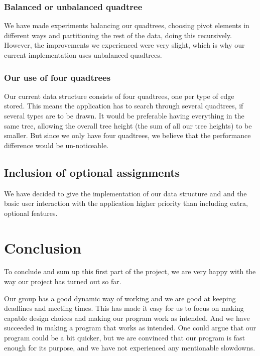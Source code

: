 \documentclass[a4paper,11pt]{article}
\begin{document}
\subsubsection{Balanced or unbalanced quadtree} %
We have made experiments balancing our quadtrees, choosing pivot elements in different ways and partitioning the rest of the data, doing this recursively. However, the improvements we experienced were very slight, which is why our current implementation uses unbalanced quadtrees.

\subsubsection{Our use of four quadtrees} %
Our current data structure consists of four quadtrees, one per type of edge stored. This means the application has to search through several quadtrees, if several types are to be drawn. It would be preferable having everything in the same tree, allowing the overall tree height (the sum of all our tree heights) to be smaller. But since we only have four quadtrees, we believe that the performance difference would be un-noticeable.

\subsection{Inclusion of optional assignments} %
We have decided to give the implementation of our data structure and and the basic user interaction with the application higher priority than including extra, optional features.

\pagebreak
\section{Conclusion} %
\label{sec:Conclusion}
To conclude and sum up this first part of the project, we are very happy with the way our project has turned out so far. 

Our group has a good dynamic way of working and we are good at keeping deadlines and meeting times. This has made it easy for us to focus on making
capable design choices and making our program work as intended. And we have succeeded in making a program that works as intended. One could argue that our program could be a bit quicker, but we are convinced that our program is fast enough for its purpose, and we have not experienced any mentionable slowdowns. 
\end{document}
